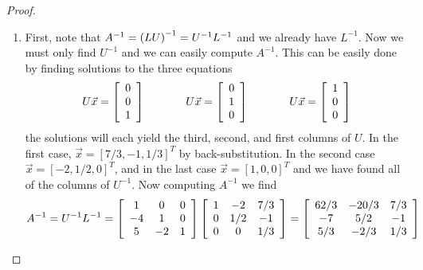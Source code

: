 \documentclass{tutorial}
\begin{document}
\begin{proof}
\begin{enumerate}[label=(\alph*)]
\item First, note that $A^{-1} = \left( LU \right)^{-1} = U^{-1} L^{-1}$ and we already have $L^{-1}$. Now we must only find $U^{-1}$ and we can easily compute $A^{-1}$. This can be easily done by finding solutions to the three equations
\[ 
	U \vec{x}
	= \left[ \begin{array}{c}
		0 \\
		0 \\
		1
	\end{array} \right]
	\hspace{0.5in}
	U \vec{x}
	= \left[ \begin{array}{c}
		0 \\
		1 \\
		0
	\end{array} \right]
	\hspace{0.5in}
	U \vec{x}
	= \left[ \begin{array}{c}
		1 \\
		0 \\
		0
	\end{array} \right]
\]
the solutions will each yield the third, second, and first columns of $U$. In the first case, $\vec{x} = [7/3,-1,1/3]^T$ by back-substitution. In the second case $\vec{x} = [-2,1/2,0]^T$, and in the last case $\vec{x} = [1,0,0]^T$ and we have found all of the columns of $U^{-1}$. Now computing $A^{-1}$ we find
\[ 
	A^{-1} = U^{-1} L^{-1} = 
	\left[ \begin{array}{ccc}
		 1 & 0& 0 \\
		 -4 & 1& 0\\
		 5 & -2& 1
	\end{array} \right]
	\left[ \begin{array}{ccc}
		 1 & -2& 7/3 \\
		 0 & 1/2& -1\\
		 0 & 0& 1/3
	\end{array} \right]
	= 
	\left[ \begin{array}{ccc}
		 62/3 & -20/3& 7/3 \\
		 -7 & 5/2& -1\\
		 5/3 & -2/3& 1/3
	\end{array} \right]
\]
\end{enumerate}
\end{proof}\else \newpage \mbox{} \newpage \fi
\end{document}

